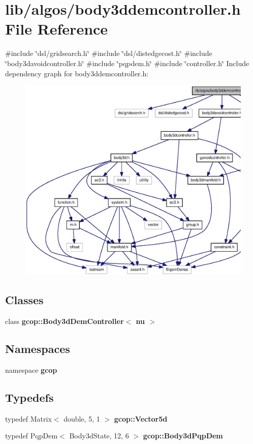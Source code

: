 \section{lib/algos/body3ddemcontroller.h \-File \-Reference}
\label{body3ddemcontroller_8h}
{\ttfamily \#include \char`\"{}dsl/gridsearch.\-h\char`\"{}}\*
{\ttfamily \#include \char`\"{}dsl/distedgecost.\-h\char`\"{}}\*
{\ttfamily \#include \char`\"{}body3davoidcontroller.\-h\char`\"{}}\*
{\ttfamily \#include \char`\"{}pqpdem.\-h\char`\"{}}\*
{\ttfamily \#include \char`\"{}controller.\-h\char`\"{}}\*
\-Include dependency graph for body3ddemcontroller.\-h\-:
\nopagebreak
\begin{figure}[H]
\begin{center}
\leavevmode
\includegraphics[width=350pt]{body3ddemcontroller_8h__incl}
\end{center}
\end{figure}
\subsection*{\-Classes}
\begin{DoxyCompactItemize}
\item 
class {\bf gcop\-::\-Body3d\-Dem\-Controller$<$ nu $>$}
\end{DoxyCompactItemize}
\subsection*{\-Namespaces}
\begin{DoxyCompactItemize}
\item 
namespace {\bf gcop}
\end{DoxyCompactItemize}
\subsection*{\-Typedefs}
\begin{DoxyCompactItemize}
\item 
typedef \-Matrix$<$ double, 5, 1 $>$ {\bf gcop\-::\-Vector5d}
\item 
typedef \-Pqp\-Dem$<$ \-Body3d\-State, 12, 6 $>$ {\bf gcop\-::\-Body3d\-Pqp\-Dem}
\end{DoxyCompactItemize}
